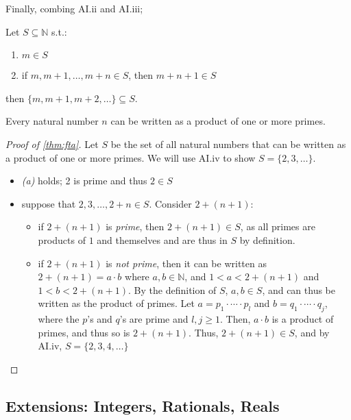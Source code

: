 \documentclass[12pt]{article}
\begin{document}
Finally, combing AI.ii and AI.iii;
\begin{axiom}[AI.iv]
  Let $S \subseteq \mathbb{N}$ s.t.:
  \begin{enumerate}[label=(\alph*)]
    \item $m \in S$
    \item if $m, m + 1, \dots, m + n \in S$, then $m + n + 1 \in S$
  \end{enumerate}
  then $\{m, m+1, m+2, \dots\} \subseteq S$.
\end{axiom}

\begin{theorem}\label{thm:fta}
  Every natural number $n$ can be written as a product of one or more primes. \footnotemark
\end{theorem}
\begin{proof}[Proof of \cref{thm:fta}]
  Let $S$ be the set of all natural numbers that can be written as a product of one or more primes. We will use AI.iv to show $S = \{2, 3, \dots \}$.
  \begin{itemize}
    \item \textit{(a)} holds; 2 is prime and thus $2 \in S$
    \item suppose that $2, 3, \dots, 2 + n \in S$. Consider $2 + (n+1)$:
    \begin{itemize}
      \item if $2 + (n+1)$ is \textit{prime}, then $2 + (n+1) \in S$, as all primes are products of $1$ and themselves and are thus in $S$ by definition.
      \item if $2 + (n+1)$ is \textit{not prime}, then it can be written as $2 + (n+1) = a \cdot b$ where $a,b \in \mathbb{N}$, and $ 1 < a < 2 + (n+1)$ and $1 < b < 2 + (n+1)$. By the definition of $S$, $a,b \in S$, and can thus be written as the product of primes. Let $a = p_1 \cdot \cdots \cdot p_l$ and $b = q_1 \cdot \cdots \cdot q_j$, where the $p$'s and $q$'s are prime and $l, j \geq 1$. Then, $a\cdot b$ is a product of primes, and thus so is $2 + (n+1)$. Thus, $2 + (n+1) \in S$, and by AI.iv, $S = \{2, 3, 4, \dots\}$
    \end{itemize}
  \end{itemize}
\end{proof}

\subsection{Extensions: Integers, Rationals, Reals}
\end{document}

